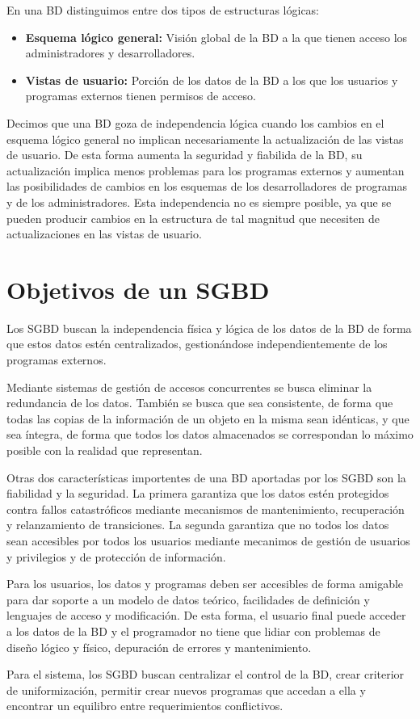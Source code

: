 En una BD distinguimos entre dos tipos de estructuras lógicas:

\begin{itemize}
	\item\textbf{Esquema lógico general:} Visión global de la BD a la que tienen acceso los administradores y desarrolladores.
	\item\textbf{Vistas de usuario:} Porción de los datos de la BD a los que los usuarios y programas externos tienen permisos de acceso.
\end{itemize}

Decimos que una BD goza de independencia lógica cuando los cambios en el esquema lógico general no implican necesariamente la actualización de las vistas de usuario.
De esta forma aumenta la seguridad y fiabilida de la BD, su actualización implica menos problemas para los programas externos y aumentan las posibilidades de cambios en los esquemas de los desarrolladores de programas y de los administradores.
Esta independencia no es siempre posible, ya que se pueden producir cambios en la estructura de tal magnitud que necesiten de actualizaciones en las vistas de usuario.

\section{Objetivos de un SGBD}

Los SGBD buscan la independencia física y lógica de los datos de la BD de forma que estos datos estén centralizados, gestionándose independientemente de los programas externos.

Mediante sistemas de gestión de accesos concurrentes se busca eliminar la redundancia de los datos.
También se busca que sea consistente, de forma que todas las copias de la información de un objeto en la misma sean idénticas, y que sea íntegra, de forma que todos los datos almacenados se correspondan lo máximo posible con la realidad que representan.

Otras dos características importentes de una BD aportadas por los SGBD son la fiabilidad y la seguridad.
La primera garantiza que los datos estén protegidos contra fallos catastróficos mediante mecanismos de mantenimiento, recuperación y relanzamiento de transiciones.
La segunda garantiza que no todos los datos sean accesibles por todos los usuarios mediante mecanimos de gestión de usuarios y privilegios y de protección de información.

Para los usuarios, los datos y programas deben ser accesibles de forma amigable para dar soporte a un modelo de datos teórico, facilidades de definición y lenguajes de acceso y modificación.
De esta forma, el usuario final puede acceder a los datos de la BD y el programador no tiene que lidiar con problemas de diseño lógico y físico, depuración de errores y mantenimiento.

Para el sistema, los SGBD buscan centralizar el control de la BD, crear criterior de uniformización, permitir crear nuevos programas que accedan a ella y encontrar un equilibro entre requerimientos conflictivos.
